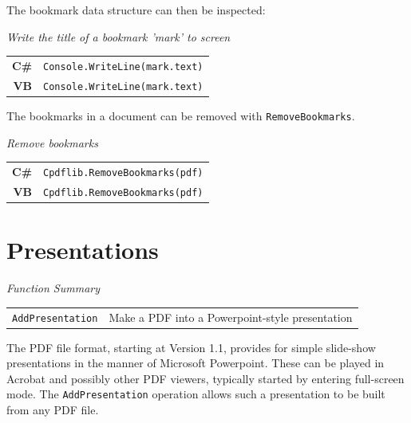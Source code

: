 \documentclass[a4paper]{memoir}
\begin{document}
The bookmark data structure can then be inspected:
\begin{framed}
\noindent\textit{Write the title of a bookmark 'mark' to screen}

\vspace{2mm}
\noindent\begin{tabular}{rl}
\small\sffamily\textbf{C\#} &
\begin{minipage}{4in}
\small\verb!Console.WriteLine(mark.text)!
\end{minipage}\\[5mm]
\small\sffamily\textbf{VB} &
\begin{minipage}{4in}
\small\verb!Console.WriteLine(mark.text)!
\end{minipage}\\[5mm]
\end{tabular}
\end{framed}

The bookmarks in a document can be removed with \verb!RemoveBookmarks!.
\begin{framed}
\noindent\textit{Remove bookmarks}

\vspace{2mm}
\noindent\begin{tabular}{rl}
\small\sffamily\textbf{C\#} &
\begin{minipage}{4in}
\small\verb!Cpdflib.RemoveBookmarks(pdf)!
\end{minipage}\\[5mm]
\small\sffamily\textbf{VB} &
\begin{minipage}{4in}
\small\verb!Cpdflib.RemoveBookmarks(pdf)!
\end{minipage}\\[5mm]
\end{tabular}
\end{framed}

\chapter{Presentations}
\begin{framed}
\noindent\textit{Function Summary}\\[2mm]
\noindent\begin{tabular}{ll}
\verb!AddPresentation! & Make a PDF into a Powerpoint-style presentation\\
\end{tabular}
\end{framed}
The PDF file format, starting at Version 1.1, provides for simple slide-show
presentations in the manner of Microsoft Powerpoint. These can be played in
Acrobat and possibly other PDF viewers, typically started by entering
full-screen mode. The \verb!AddPresentation! operation allows such a
presentation to be built from any PDF file.
\end{document}
